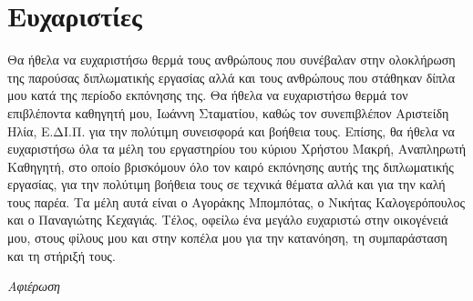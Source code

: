 \chapter*{Ευχαριστίες}

\pagestyle{plain}

Θα ήθελα να ευχαριστήσω θερμά τους ανθρώπους που συνέβαλαν στην ολοκλήρωση
της παρούσας διπλωματικής εργασίας αλλά και τους ανθρώπους που στάθηκαν δίπλα μου κατά της περίοδο εκπόνησης της. Θα ήθελα να ευχαριστήσω θερμά τον επιβλέποντα καθηγητή μου, Ιωάννη Σταματίου, καθώς τον συνεπιβλέπον Αριστείδη Ηλία, Ε.ΔΙ.Π. για την πολύτιμη συνεισφορά και βοήθεια τους. Επίσης, θα ήθελα να ευχαριστήσω όλα τα μέλη του εργαστηρίου του κύριου Χρήστου Μακρή, Αναπληρωτή Καθηγητή, στο οποίο βρισκόμουν όλο τον καιρό εκπόνησης αυτής της διπλωματικής εργασίας, για την πολύτιμη βοήθεια τους σε τεχνικά θέματα αλλά και για την καλή τους παρέα. Τα μέλη αυτά είναι ο Αγοράκης Μπομπότας, ο Νικήτας Καλογερόπουλος και ο Παναγιώτης Κεχαγιάς. Τέλος, οφείλω ένα μεγάλο ευχαριστώ στην οικογένειά μου, στους φίλους μου και στην κοπέλα μου για την κατανόηση, τη συμπαράσταση και τη στήριξή τους.

\null\vfill
\begin{flushright}
    \textit{Αφιέρωση}
\end{flushright}